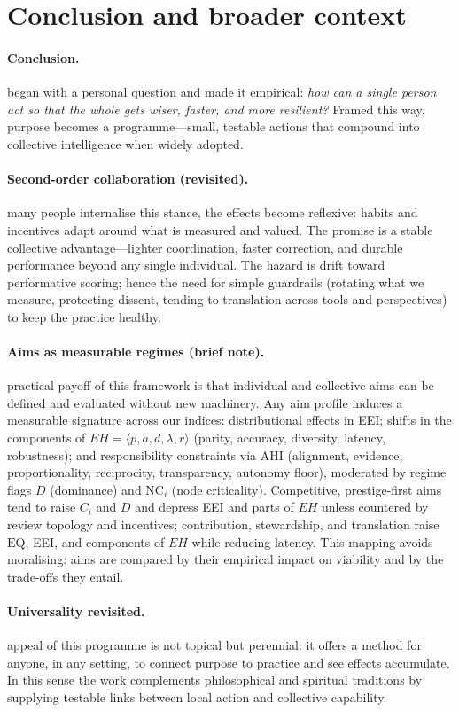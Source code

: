 \documentclass[12pt]{article}
\begin{document}
\section{Conclusion and broader context}\n\n\paragraph{Conclusion.}\nWe began with a personal question and made it empirical: \emph{how can a single person act so that the whole gets wiser, faster, and more resilient?} Framed this way, purpose becomes a programme—small, testable actions that compound into collective intelligence when widely adopted.\n\n\paragraph{Second-order collaboration (revisited).}\nIf many people internalise this stance, the effects become reflexive: habits and incentives adapt around what is measured and valued. The promise is a stable collective advantage—lighter coordination, faster correction, and durable performance beyond any single individual. The hazard is drift toward performative scoring; hence the need for simple guardrails (rotating what we measure, protecting dissent, tending to translation across tools and perspectives) to keep the practice healthy.\n\n\paragraph{Aims as measurable regimes (brief note).}\nA practical payoff of this framework is that individual and collective aims can be defined and evaluated without new machinery. Any aim profile induces a measurable signature across our indices: distributional effects in EEI; shifts in the components of $EH=\langle p,a,d,\lambda,r\rangle$ (parity, accuracy, diversity, latency, robustness); and responsibility constraints via AHI (alignment, evidence, proportionality, reciprocity, transparency, autonomy floor), moderated by regime flags $D$ (dominance) and $\mathrm{NC}_i$ (node criticality). Competitive, prestige-first aims tend to raise $C_i$ and $D$ and depress EEI and parts of $EH$ unless countered by review topology and incentives; contribution, stewardship, and translation raise $\mathrm{EQ}$, EEI, and components of $EH$ while reducing latency. This mapping avoids moralising: aims are compared by their empirical impact on viability and by the trade-offs they entail.\n\n\paragraph{Universality revisited.}\nThe appeal of this programme is not topical but perennial: it offers a method for anyone, in any setting, to connect purpose to practice and see effects accumulate. In this sense the work complements philosophical and spiritual traditions by supplying testable links between local action and collective capability.\n
\end{document}
